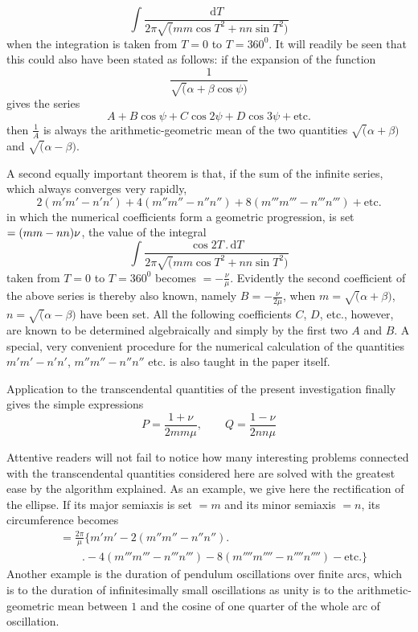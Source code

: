 \[
\int\frac{\mathrm{d}T}{2\pi\surd(mm\cos T^{2}+nn\sin T^{2})}
\]
when the integration is taken from $T=0$ to $T=360^{0}$. It will readily be seen that this could also have been stated as follows: if the expansion of the function
\[
\frac{1}{\surd(\alpha+\beta\cos\psi)}
\]
gives the series
\[
A+B\cos\psi+C\cos2\psi+D\cos3\psi+\mathrm{etc.}
\]
then $\frac{1}{A}$ is always the arithmetic-geometric mean of the two quantities $\surd(\alpha+\beta)$ and $\surd(\alpha-\beta)$.

A second equally important theorem is that, if the sum of the infinite series, which always converges very rapidly,
\[
2(m'm'-n'n')+4(m''m''-n''n'')+8(m'''m'''-n'''n''')+\mbox{etc.}
\]
in which the numerical coefficients form a geometric progression, is set $=\nobreak{}(mm-nn)\nu$, the value of the integral
\[
\int\frac{\cos2T\,.\,\mathrm{d}T}
{2\pi\surd(mm\cos T^{2}+nn\sin T^{2})}
\]
taken from $T=0$ to $T=360^{0}$ becomes $=-\frac{\nu}{\mu}$. Evidently the second coefficient of the above series is thereby also known, namely $B=-\frac{\nu}{2\mu}$, when $m=\surd(\alpha+\beta)$, $n=\surd(\alpha-\beta)$ have been set. All the following coefficients $C$, $D$, etc., however, are known to be determined algebraically and simply by the first two $A$ and $B$. A special, very convenient procedure for the numerical calculation of the quantities $m'm'-n'n'$, $m''m''-n''n''$ etc. is also taught in the paper itself.
\par
Application to the transcendental quantities of the present investigation finally gives the simple expressions
\[
P=\frac{1+\nu}{2mm\mu},\qquad Q=\frac{1-\nu}{2nn\mu}
\]
\par Attentive readers will not fail to notice how many interesting problems connected with the transcendental quantities considered here are solved with the greatest ease by the algorithm explained. As an example, we give here the rectification of the ellipse. If its major semiaxis is set $=m$ and its minor semiaxis $=n$, its circumference becomes
\[
\begin{aligned}&=\frac{2\pi}{\mu}\bigl\{m'm'-2(m''m''-n''n'')\bigr.\\[5pt]&\qquad\bigl.-4(m'''m'''-n'''n''')-8(m''''m''''-n''''n'''')-\mathrm{etc.}\bigr\}\end{aligned}
\]
Another example is the duration of pendulum oscillations over finite arcs, which is to the duration of infinitesimally small oscillations as unity is to the arithmetic-geometric mean between $1$ and the cosine of one quarter of the whole arc of oscillation.

